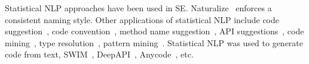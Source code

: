 Statistical NLP approaches have been used in SE.
%
Naturalize~\cite{barr-codeconvention-fse14}  enforces a
consistent naming style.
%
%
Other applications of statistical NLP include code
suggestion~\cite{hindle-icse12,tbcnn14}, code
convention~\cite{barr-codeconvention-fse14}, method name
suggestion~\cite{sutton-fse15}, API suggestions~\cite{raychev-pldi14},
code mining~\cite{sutton-msr13}, type resolution~\cite{icse18}, pattern mining~\cite{sutton-16}.
Statistical NLP was used to generate code from text, \eg
SWIM~\cite{Raghothaman-ICSE16}, DeepAPI~\cite{gu-fse16},
Anycode~\cite{anycode-oopsla15}, etc.

